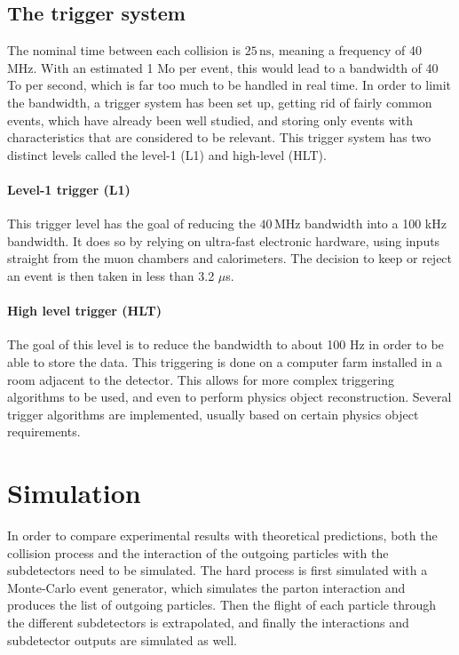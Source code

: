 \subsection{The trigger system}
\label{sec:trigger}

The nominal time between each collision is $25\,\mathrm{ns}$, meaning a frequency of 40 MHz. With an estimated 1 Mo per event, this would lead to a bandwidth of 40 To per second, which is far too much to be handled in real time. In order to limit the bandwidth, a trigger system has been set up, getting rid of fairly common events, which have already been well studied, and storing only events with characteristics that are considered to be relevant. This trigger system has two distinct levels called the level-1 (L1) and high-level (HLT).

\paragraph{Level-1 trigger (L1)} This trigger level has the goal of reducing the $40\,\mathrm{MHz}$ bandwidth into a 100 kHz bandwidth. It does so by relying on ultra-fast electronic hardware, using inputs straight from the muon chambers and calorimeters. The decision to keep or reject an event is then taken in less than 3.2 $\mu$s. 

\paragraph{High level trigger (HLT)} The goal of this level is to reduce the bandwidth to about 100 Hz in order to be able to store the data. This triggering is done on a computer farm installed in a room adjacent to the detector. This allows for more complex triggering algorithms to be used, and even to perform physics object reconstruction. Several trigger algorithms are implemented, usually based on certain physics object requirements.

\section{Simulation}
\label{sec:simulation}

In order to compare experimental results with theoretical predictions, both the collision process and the interaction of the outgoing particles with the subdetectors need to be simulated. The hard process is first simulated with a Monte-Carlo event generator, which simulates the parton interaction and produces the list of outgoing particles. Then the flight of each particle through the different subdetectors is extrapolated, and finally the interactions and subdetector outputs are simulated as well.

